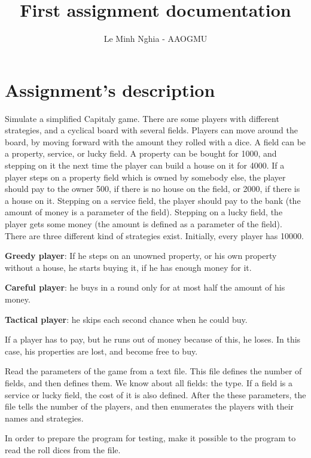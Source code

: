 \documentclass[a4paper, 12pt]{report}
\begin{document}
\title{First assignment documentation}
\author{Le Minh Nghia - AAOGMU}
\maketitle
{}
\tableofcontents

\chapter{Assignment's description}
	Simulate a simplified Capitaly game. There are some players with different strategies, and a
cyclical board with several fields. Players can move around the board, by moving forward with
the amount they rolled with a dice. A field can be a property, service, or lucky field.
A property can be bought for 1000, and stepping on it the next time the player can build a house
on it for 4000. If a player steps on a property field which is owned by somebody else, the player
should pay to the owner 500, if there is no house on the field, or 2000, if there is a house on it.
Stepping on a service field, the player should pay to the bank (the amount of money is a
parameter of the field). Stepping on a lucky field, the player gets some money (the amount is
defined as a parameter of the field). There are three different kind of strategies exist. Initially,
every player has 10000.

\textbf{Greedy player}: If he steps on an unowned property, or his own property without a house, he
starts buying it, if he has enough money for it.

\textbf{Careful player}: he buys in a round only for at most half the amount of his money.

\textbf{Tactical player}: he skips each second chance when he could buy.

If a player has to pay, but he runs out of money because of this, he loses. In this case, his
properties are lost, and become free to buy.

Read the parameters of the game from a text file. This file defines the number of fields, and then
defines them. We know about all fields: the type. If a field is a service or lucky field, the cost of it
is also defined. After the these parameters, the file tells the number of the players, and then
enumerates the players with their names and strategies.

In order to prepare the program for testing, make it possible to the program to read the roll dices
from the file.
\end{document}
